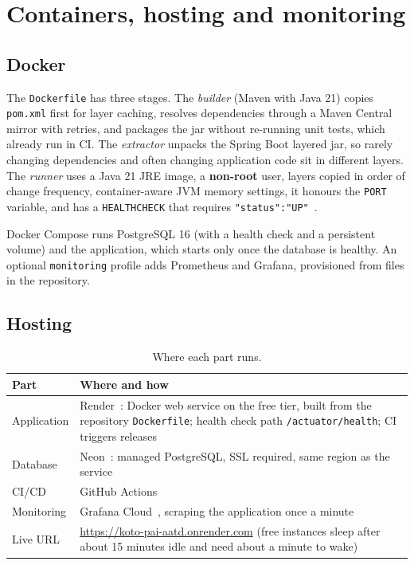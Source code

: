 \documentclass[10pt,a4paper]{article}
\newcommand{\code}[1]{\texttt{#1}}
\begin{document}
\section{Containers, hosting and monitoring}

\subsection{Docker}

The \code{Dockerfile} has three stages. The \emph{builder} (Maven with Java 21) copies \code{pom.xml} first for layer
caching, resolves dependencies through a Maven Central mirror with retries, and packages the jar without re-running
unit tests, which already run in CI. The \emph{extractor} unpacks the Spring Boot layered jar, so rarely changing
dependencies and often changing application code sit in different layers. The \emph{runner} uses a Java 21 JRE image,
a \textbf{non-root} user, layers copied in order of change frequency, container-aware JVM memory settings, it honours
the \code{PORT} variable, and has a \code{HEALTHCHECK} that requires \code{"status":"UP"}~\cite{docker}.

Docker Compose runs PostgreSQL 16 (with a health check and a persistent volume) and the application, which starts only
once the database is healthy. An optional \code{monitoring} profile adds Prometheus and Grafana, provisioned from
files in the repository.

\subsection{Hosting}

\begin{table}[H]
\centering\small
\caption{Where each part runs.}
\begin{tabularx}{\textwidth}{@{}>{\raggedright\arraybackslash}p{2.6cm}Y@{}}
\toprule
Part & Where and how \\
\midrule
Application & Render~\cite{render}: Docker web service on the free tier, built from the repository \code{Dockerfile}; health check path \code{/actuator/health}; CI triggers releases \\
Database & Neon~\cite{neon}: managed PostgreSQL, SSL required, same region as the service \\
CI/CD & GitHub Actions~\cite{actions} \\
Monitoring & Grafana Cloud~\cite{grafana}, scraping the application once a minute \\
Live URL & \url{https://koto-pai-aatd.onrender.com} (free instances sleep after about 15 minutes idle and need about a minute to wake) \\
\bottomrule
\end{tabularx}
\end{table}
\end{document}

